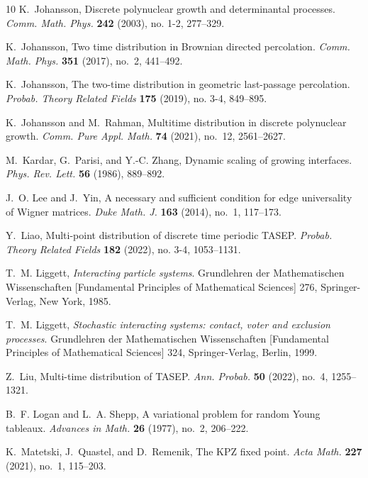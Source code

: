 \documentclass[10pt]{article}
\theoremstyle{plain}
\theoremstyle{definition}
\numberwithin{equation}{section}
\begin{document}
\begin{thebibliography}{10}
K.~Johansson, Discrete polynuclear growth and determinantal processes.
  \emph{Comm. Math. Phys.} \textbf{242} (2003), no. 1-2, 277--329.

K.~Johansson, Two time distribution in {B}rownian directed percolation.
  \emph{Comm. Math. Phys.} \textbf{351} (2017), no.~2, 441--492.

K.~Johansson, The two-time distribution in geometric last-passage percolation.
  \emph{Probab. Theory Related Fields} \textbf{175} (2019), no. 3-4, 849--895.

K.~Johansson and M.~Rahman, Multitime distribution in discrete polynuclear
  growth. 
  \emph{Comm. Pure Appl. Math.} \textbf{74} (2021), no.~12, 2561--2627.



M.~Kardar, G.~Parisi, and Y.-C. Zhang, Dynamic scaling of growing interfaces.
  \emph{Phys. Rev. Lett.} \textbf{56} (1986), 889--892.

J.~O. Lee and J.~Yin, A necessary and sufficient condition for edge
  universality of {W}igner matrices. \emph{Duke Math. J.} \textbf{163} (2014),
  no.~1, 117--173.

Y.~Liao, Multi-point distribution of discrete time periodic {TASEP}. \emph{Probab. Theory Related Fields} \textbf{182} (2022), no. 3-4, 1053--1131.


T.~M. Liggett, \emph{Interacting particle systems}. Grundlehren der
  Mathematischen Wissenschaften [Fundamental Principles of Mathematical
  Sciences] 276, Springer-Verlag, New York, 1985.

T.~M. Liggett, \emph{Stochastic interacting systems: contact, voter and
  exclusion processes}. Grundlehren der Mathematischen Wissenschaften
  [Fundamental Principles of Mathematical Sciences] 324, Springer-Verlag,
  Berlin, 1999.

Z.~Liu, Multi-time distribution of {TASEP}. 
\emph{Ann.
  Probab.} \textbf{50} (2022), no.~4, 1255--1321.
  

B.~F. Logan and L.~A. Shepp, A variational problem for random {Y}oung tableaux.
  \emph{Advances in Math.} \textbf{26} (1977), no.~2, 206--222.

K.~Matetski, J.~Quastel, and D.~Remenik, The {KPZ} fixed point.   \emph{Acta Math.} \textbf{227} (2021), no.~1, 115--203.


\end{thebibliography}
\end{document}
